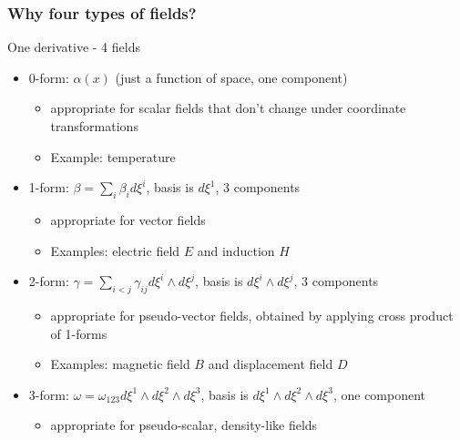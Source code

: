 \documentclass[aspectratio=169]{beamer}
\begin{document}
\begin{frame}[t]
  \frametitle{Why four types of fields?}
    \begin{block}{One derivative - 4 fields }
      \begin{itemize}%
	  \item 0-form: $\alpha(x)$ (just a function of space, one component)
        \begin{itemize}
          \item appropriate for scalar fields that don't change under coordinate transformations
          \item Example: temperature
        \end{itemize}
      \item 1-form: $\beta = \sum_i \beta_i d\xi^i$, basis is $d \xi^1$, 3 components
        \begin{itemize}
          \item appropriate for vector fields
          \item Examples: electric field $E$ and induction $H$
        \end{itemize}
      \item 2-form: $\gamma = \sum_{i < j} \gamma_{ij} d\xi^i \wedge d\xi^j$, basis is $d\xi^i \wedge d\xi^j$, 3 components
         \begin{itemize}
          \item appropriate for pseudo-vector fields, obtained by applying cross product of 1-forms
          \item Examples: magnetic field $B$ and displacement field $D$
        \end{itemize}
   \item 3-form: $\omega = \omega_{123} d\xi^1 \wedge d\xi^2 \wedge d\xi^3$, basis is $d\xi^1 \wedge d\xi^2 \wedge d\xi^3$, one component
         \begin{itemize}
          \item appropriate for pseudo-scalar, density-like fields 
        \end{itemize}
    \end{itemize}
  \end{block}
\end{frame}
\end{document}

